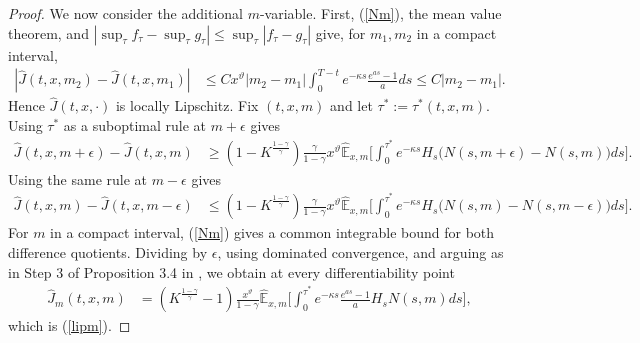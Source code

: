 \documentclass[a4paper,11pt]{amsart}
\numberwithin{equation}{section}
\begin{document}
{\begin{proof}
We now consider the additional $m$-variable. First, (\ref{Nm}), the mean value theorem, and $|\sup_\tau f_\tau-\sup_\tau g_\tau|\leq\sup_\tau|f_\tau-g_\tau|$ give, for $m_1,m_2$ in a compact interval,
\begin{align*}
|\widehat J(t,x,m_2)-\widehat J(t,x,m_1)|&\leq Cx^\vartheta|m_2-m_1|\int_0^{T-t}e^{-\kappa s}\frac{e^{as}-1}{a}ds\leq C|m_2-m_1|.
\end{align*}
Hence $\widehat J(t,x,\cdot)$ is locally Lipschitz. Fix $(t,x,m)$ and let $\tau^\ast:=\tau^\ast(t,x,m)$. Using $\tau^\ast$ as a suboptimal rule at $m+\epsilon$ gives
\begin{align*}
\widehat J(t,x,m+\epsilon)-\widehat J(t,x,m)&\geq(1-K^{\frac{1-\gamma}{\gamma}})\frac{\gamma}{1-\gamma}x^\vartheta\widehat{\mathbb E}_{x,m}\bigg[\int_0^{\tau^\ast}e^{-\kappa s}H_s\big(N(s,m+\epsilon)-N(s,m)\big)ds\bigg].
\end{align*}
Using the same rule at $m-\epsilon$ gives
\begin{align*}
\widehat J(t,x,m)-\widehat J(t,x,m-\epsilon)&\leq(1-K^{\frac{1-\gamma}{\gamma}})\frac{\gamma}{1-\gamma}x^\vartheta\widehat{\mathbb E}_{x,m}\bigg[\int_0^{\tau^\ast}e^{-\kappa s}H_s\big(N(s,m)-N(s,m-\epsilon)\big)ds\bigg].
\end{align*}
For $m$ in a compact interval, (\ref{Nm}) gives a common integrable bound for both difference quotients. Dividing by $\epsilon$, using dominated convergence, and arguing as in Step 3 of Proposition 3.4 in \citet{de2019free}, we obtain at every differentiability point
\begin{align*}
\widehat J_m(t,x,m)&=(K^{\frac{1-\gamma}{\gamma}}-1)\frac{x^\vartheta}{1-\gamma}\widehat{\mathbb E}_{x,m}\bigg[\int_0^{\tau^\ast}e^{-\kappa s}\frac{e^{as}-1}{a}H_sN(s,m)ds\bigg],
\end{align*}
which is (\ref{lipm}).


\end{proof}}
\end{document}

